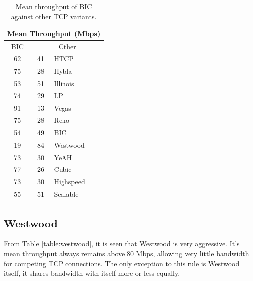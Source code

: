 \documentclass[11pt,a4paper,twocolumn]{article}
\begin{document}
\begin{table}[h!]
	\begin{center}
		\begin{tabular}{| c | c | l |}
    			\hline
			\multicolumn{3}{|c|}{Mean Throughput (Mbps)} \\
    			\hline
    			BIC &  \multicolumn{2}{|c|}{Other}  \\
			\hline
    			62 & 41 & HTCP \\
			\hline
    			75 & 28 & Hybla \\
			\hline
    			53 & 51 & Illinois \\
			\hline
    			74 & 29 & LP \\
			\hline
    			91 & 13 & Vegas \\
			\hline
    			75 & 28 & Reno \\
			\hline
    			54 & 49 & BIC \\
			\hline
    			19 & 84 & Westwood \\
			\hline
    			73 & 30 & YeAH \\
			\hline
    			77 & 26 & Cubic \\
			\hline
    			73 & 30 & Highspeed \\
			\hline
    			55 & 51 & Scalable \\
    			\hline
    		\end{tabular}
  	\end{center}
  	\caption{Mean throughput of BIC against other TCP variants.}
	\label{table:bic}
\end{table}

\subsection{Westwood}
\label{subsec:westwood}
From Table \ref{table:westwood}, it is seen that Westwood is very aggressive. It's mean throughput always
remains above 80 Mbps, allowing very little bandwidth for competing TCP connections. The only exception to this
rule is Westwood itself, it shares bandwidth with itself more or less equally.
\end{document}
